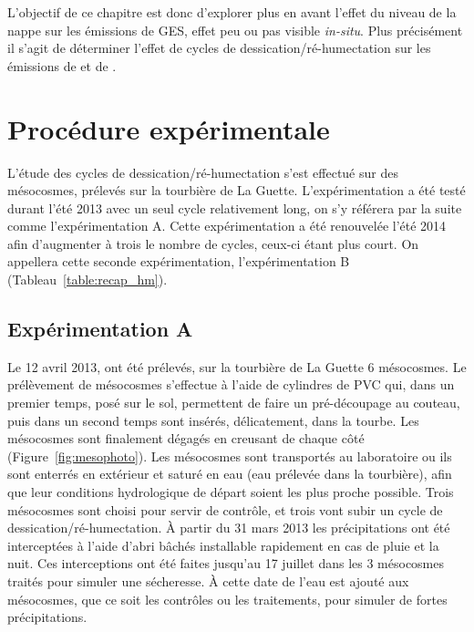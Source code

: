 L'objectif de ce chapitre est donc d'explorer plus en avant l'effet du niveau de la nappe sur les émissions de GES, effet peu ou pas visible \textit{in-situ}.
Plus précisément il s'agit de déterminer l'effet de cycles de dessication/ré-humectation sur les émissions de \coo et de \chh. 

\section{Procédure expérimentale}

L'étude des cycles de dessication/ré-humectation s'est effectué sur des mésocosmes, prélevés sur la tourbière de La Guette.
L'expérimentation a été testé durant l'été 2013 avec un seul cycle relativement long, on s'y référera par la suite comme l'expérimentation A.
Cette expérimentation a été renouvelée l'été 2014 afin d'augmenter à trois le nombre de cycles, ceux-ci étant plus court.
On appellera cette seconde expérimentation, l'expérimentation B (Tableau~\ref{table:recap_hm}).

\subsection{Expérimentation A}
Le 12 avril 2013, ont été prélevés, sur la tourbière de La Guette 6 mésocosmes.
Le prélèvement de mésocosmes s'effectue à l'aide de cylindres de PVC qui, dans un premier temps, posé sur le sol, permettent de faire un pré-découpage au couteau, puis dans un second temps sont insérés, délicatement, dans la tourbe. 
Les mésocosmes sont finalement dégagés en creusant de chaque côté (Figure~\ref{fig:mesophoto}).
Les mésocosmes sont transportés au laboratoire ou ils sont enterrés en extérieur et saturé en eau (eau prélevée dans la tourbière), afin que leur conditions hydrologique de départ soient les plus proche possible.
Trois mésocosmes sont choisi pour servir de contrôle, et trois vont subir un cycle de dessication/ré-humectation.
À partir du 31 mars 2013 les précipitations ont été interceptées à l'aide d'abri bâchés installable rapidement en cas de pluie et la nuit.
Ces interceptions ont été faites jusqu'au 17 juillet dans les 3 mésocosmes traités pour simuler une sécheresse.
À cette date de l'eau est ajouté aux mésocosmes, que ce soit les contrôles ou les traitements, pour simuler de fortes précipitations.

